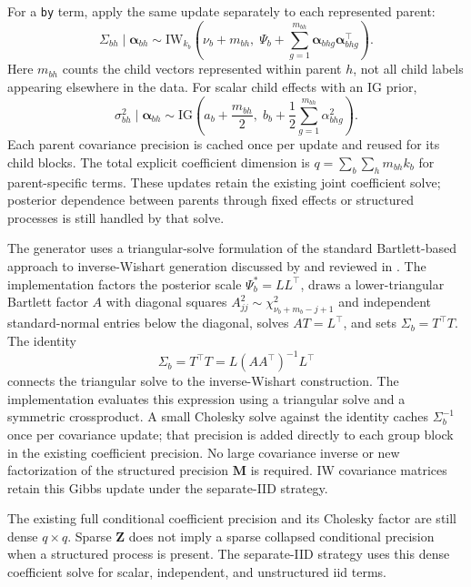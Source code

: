 \documentclass[11pt]{article}
\newcommand{\balpha}{\bm{\alpha}}
\newcommand{\bM}{\bm{M}}
\newcommand{\bZ}{\bm{Z}}
\newcommand{\trans}{^\top}
\begin{document}
For a \texttt{by} term, apply the same update separately to each represented parent:
\begin{equation}
 \Sigma_{bh}\mid\balpha_{bh}\sim\mathrm{IW}_{k_b}\left(
 \nu_b+m_{bh},\;\Psi_b+\sum_{g=1}^{m_{bh}}\balpha_{bhg}\balpha_{bhg}\trans\right).
\end{equation}
Here $m_{bh}$ counts the child vectors represented within parent $h$, not all child labels appearing elsewhere in the data. For scalar child effects with an IG prior,
\begin{equation}
 \sigma^2_{bh}\mid\balpha_{bh}\sim\mathrm{IG}\left(
 a_b+\frac{m_{bh}}{2},\;b_b+\frac12\sum_{g=1}^{m_{bh}}\alpha_{bhg}^{2}\right).
\end{equation}
Each parent covariance precision is cached once per update and reused for its child blocks. The total explicit coefficient dimension is $q=\sum_b\sum_h m_{bh}k_b$ for parent-specific terms. These updates retain the existing joint coefficient solve; posterior dependence between parents through fixed effects or structured processes is still handled by that solve.

The generator uses a triangular-solve formulation of the standard Bartlett-based approach to inverse-Wishart generation discussed by \citet{Jones1985} and reviewed in \citet[Section~3.1]{Axen2023}. The implementation factors the posterior scale $\Psi_b^*=LL\trans$, draws a lower-triangular Bartlett factor $A$ with diagonal squares $A_{jj}^2\sim\chi^2_{\nu_b+m_b-j+1}$ and independent standard-normal entries below the diagonal, solves $AT=L\trans$, and sets $\Sigma_b=T\trans T$. The identity
\begin{equation}
 \Sigma_b=T\trans T=L(AA\trans)^{-1}L\trans
\end{equation}
connects the triangular solve to the inverse-Wishart construction. The implementation evaluates this expression using a triangular solve and a symmetric crossproduct. A small Cholesky solve against the identity caches $\Sigma_b^{-1}$ once per covariance update; that precision is added directly to each group block in the existing coefficient precision. No large covariance inverse or new factorization of the structured precision $\bM$ is required. IW covariance matrices retain this Gibbs update under the separate-IID strategy.

The existing full conditional coefficient precision and its Cholesky factor are still dense $q\times q$. Sparse $\bZ$ does not imply a sparse collapsed conditional precision when a structured process is present. The separate-IID strategy uses this dense coefficient solve for scalar, independent, and unstructured iid terms.
\end{document}
